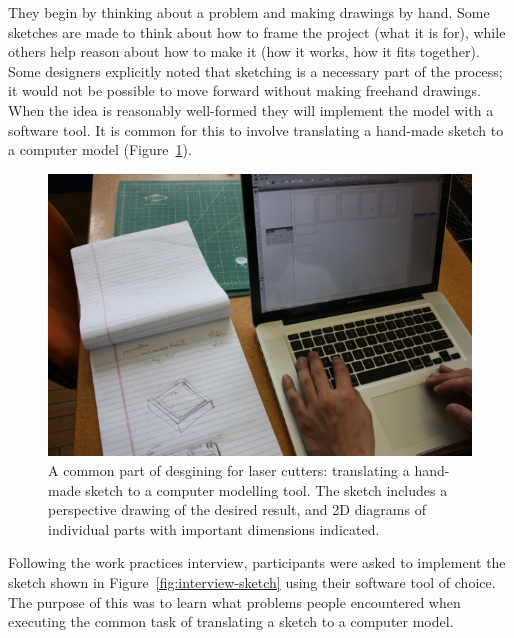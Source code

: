\documentclass{article}
\begin{document}
They begin by thinking about a problem and making drawings by
hand. Some sketches are made to think about how to frame the project
(what it is for), while others help reason about how to make it (how
it works, how it fits together). Some designers explicitly noted that
sketching is a necessary part of the process; it would not be possible
to move forward without making freehand drawings. When the idea is
reasonably well-formed they will implement the model with a software
tool. It is common for this to involve translating a hand-made sketch
to a computer model (Figure~\ref{fig:translate}).

\begin{figure}[h]
  \includegraphics[width=0.9\linewidth]{img/translate-sketch-to-computer.jpg}
  \caption{A common part of desgining for laser cutters: translating a
    hand-made sketch to a computer modelling tool. The sketch includes
    a perspective drawing of the desired result, and 2D diagrams of
    individual parts with important dimensions indicated.}
  \label{fig:translate}
\end{figure}

Following the work practices interview, participants were asked to
implement the sketch shown in Figure~\ref{fig:interview-sketch} using
their software tool of choice. The purpose of this was to learn what
problems people encountered when executing the common task of
translating a sketch to a computer model.
\end{document}
